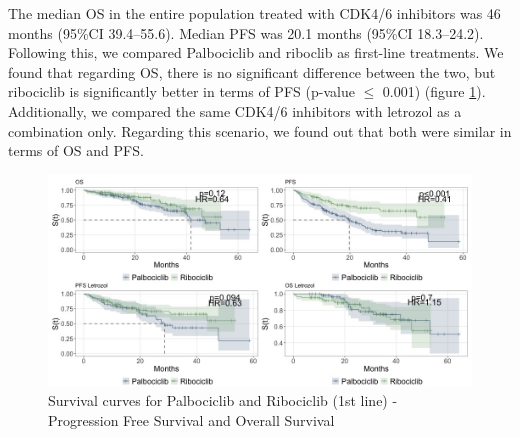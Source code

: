  The median OS in the entire population treated with CDK4/6 inhibitors was 46 months (95\%CI 39.4–55.6). Median PFS was 20.1 months (95\%CI 18.3–24.2). 
Following this, we compared Palbociclib and riboclib as first-line treatments. We found that regarding OS, there is no significant difference between the two, but ribociclib is significantly better in terms of PFS (p-value $\le$ 0.001) (figure \ref*{fig:interest}).
Additionally, we compared the same CDK4/6 inhibitors with letrozol as a combination only. Regarding this scenario, we found out that both were similar in terms of OS and PFS.



\begin{figure}[ht]
  \caption{Survival curves for Palbociclib and Ribociclib (1st line) - Progression Free Survival and Overall Survival}\label{fig:interest} 
  \includegraphics[scale=0.45]{figures/interest_curve_both.jpeg}%

\end{figure}


